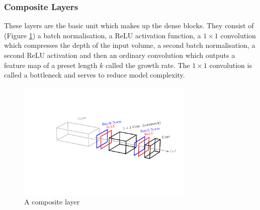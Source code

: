 \subsubsection{Composite Layers}
These layers are the basic unit which makes up the dense blocks. They consist of (Figure \ref{fig:machine_learning:composite_layer}) a batch normalisation, a ReLU activation function, a $1\times{}1$ convolution which compresses the depth of the input volume, a second batch normalisation, a second ReLU activation and then an ordinary convolution which outputs a feature map of a preset length $k$ called the growth rate. The $1\times{}1$ convolution is called a bottleneck and serves to reduce model complexity.
\begin{figure}[h!]
    \includegraphics[width=0.75\textwidth]{figures/machine_learning/composite_layer.pdf}
    \caption{A composite layer}
        \label{fig:machine_learning:composite_layer}
\end{figure}


